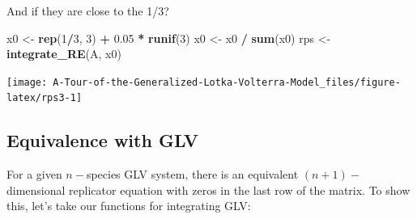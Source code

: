 \documentclass[
]{book}
\newenvironment{Shaded}{\begin{snugshade}}{\end{snugshade}}
\newcommand{\DecValTok}[1]{\textcolor[rgb]{0.00,0.00,0.81}{#1}}
\newcommand{\FloatTok}[1]{\textcolor[rgb]{0.00,0.00,0.81}{#1}}
\newcommand{\KeywordTok}[1]{\textcolor[rgb]{0.13,0.29,0.53}{\textbf{#1}}}
\newcommand{\NormalTok}[1]{#1}
\newcommand{\OperatorTok}[1]{\textcolor[rgb]{0.81,0.36,0.00}{\textbf{#1}}}
\newcommand{\StringTok}[1]{\textcolor[rgb]{0.31,0.60,0.02}{#1}}
\begin{document}
And if they are close to the 1/3?

\begin{Shaded}
\begin{Highlighting}[]
\NormalTok{x0 <-}\StringTok{ }\KeywordTok{rep}\NormalTok{(}\DecValTok{1}\OperatorTok{/}\DecValTok{3}\NormalTok{, }\DecValTok{3}\NormalTok{) }\OperatorTok{+}\StringTok{ }\FloatTok{0.05} \OperatorTok{*}\StringTok{ }\KeywordTok{runif}\NormalTok{(}\DecValTok{3}\NormalTok{)}
\NormalTok{x0 <-}\StringTok{ }\NormalTok{x0 }\OperatorTok{/}\StringTok{ }\KeywordTok{sum}\NormalTok{(x0)}
\NormalTok{rps <-}\StringTok{ }\KeywordTok{integrate_RE}\NormalTok{(A, x0)}
\end{Highlighting}
\end{Shaded}

\begin{center}\texttt{[image: A-Tour-of-the-Generalized-Lotka-Volterra-Model\_files/figure-latex/rps3-1]} \end{center}

\hypertarget{equivalence-with-glv}{%
\subsection{Equivalence with GLV}\label{equivalence-with-glv}}

For a given \(n-\)species GLV system, there is an equivalent \((n+1)-\)dimensional replicator equation with zeros in the last row of the matrix. To show this, let's take our functions for integrating GLV:
\end{document}
